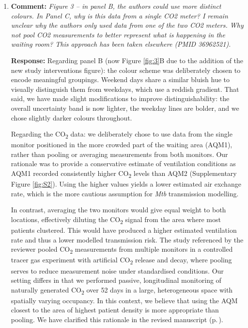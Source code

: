 \documentclass[11pt]{article}
\newcommand{\comment}[1]{\textbf{Comment:} \textit{#1}}
\newcommand{\response}[1]{\textbf{Response:} #1}
\begin{document}
\begin{enumerate}[label=\textbf{R2.\arabic*.}, leftmargin=*]
\item\label{r:2.19} \comment{Figure 3 -- in panel B, the authors could use more distinct colours. In Panel C, why is this data from a single CO2 meter? I remain unclear why the authors only used data from one of the two CO2 meters. Why not pool CO2 measurements to better represent what is happening in the waiting room? This approach has been taken elsewhere (PMID 36962521).}

\response{Regarding panel B (now Figure \ref{fig:3}B due to the addition of the new study interventions figure): the colour scheme was deliberately chosen to encode meaningful groupings. Weekend days share a similar bluish hue to visually distinguish them from weekdays, which use a reddish gradient. That said, we have made slight modifications to improve distinguishability: the overall uncertainty band is now lighter, the weekday lines are bolder, and we chose slightly darker colours throughout.

Regarding the CO\textsubscript{2} data: we deliberately chose to use data from the single monitor positioned in the more crowded part of the waiting area (AQM1), rather than pooling or averaging measurements from both monitors. Our rationale was to provide a conservative estimate of ventilation conditions as AQM1 recorded consistently higher CO\textsubscript{2} levels than AQM2 (Supplementary Figure \ref{fig:S2}). Using the higher values yields a lower estimated air exchange rate, which is the more cautious assumption for \emph{Mtb} transmission modelling.

In contrast, averaging the two monitors would give equal weight to both locations, effectively diluting the CO\textsubscript{2} signal from the area where most patients clustered. This would have produced a higher estimated ventilation rate and thus a lower modelled transmission risk. The study referenced by the reviewer \citep{beckwith2022PLOSGlobalPublicHealth} pooled CO\textsubscript{2} measurements from multiple monitors in a controlled tracer gas experiment with artificial CO\textsubscript{2} release and decay, where pooling serves to reduce measurement noise under standardised conditions. Our setting differs in that we performed passive, longitudinal monitoring of naturally generated CO\textsubscript{2} over 52 days in a large, heterogeneous space with spatially varying occupancy. In this context, we believe that using the AQM closest to the area of highest patient density is more appropriate than pooling. We have clarified this rationale in the revised manuscript (p.\,\pageref{chg:R2.19}).}


\end{enumerate}
\end{document}
